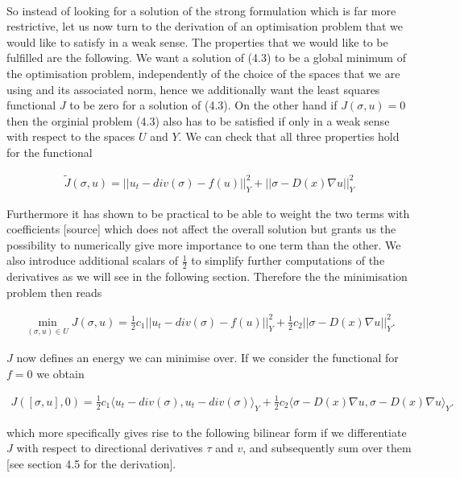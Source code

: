 \documentclass[../draft_1.tex]{subfiles}
\begin{document}
\smallskip
\\
So instead of looking for a solution of the strong formulation which is far more restrictive, let us now turn to the derivation of an optimisation problem that we would like to satisfy in a weak sense. The properties that we would like to be fulfilled are the following. We want a solution of (4.3) to be a global minimum of the optimisation problem, independently of the choice of the spaces that we are using and its associated norm, hence we additionally want the least squares functional $J$ to be zero for a solution of (4.3). On the other hand if $J(\sigma, u) = 0$ then the orginial problem (4.3) also has to be satisfied if only in a weak sense with respect to the spaces $U$ and $Y$. We can check that all three properties hold for the functional  
\begin{ceqn}
\begin{align}
\tilde{J}(\sigma, u) =|| u_t - div(\sigma) - f(u) ||_Y^2 + || \sigma - D(x) \nabla u || _Y^2
\end{align}
\end{ceqn}
Furthermore it has shown to be practical to be able to weight the two terms with coefficients [source] which does not affect the overall solution but grants us the possibility to numerically give more importance to one term than the other. We also introduce additional scalars of $\frac{1}{2}$ to simplify further computations of the derivatives as we will see in the following section. Therefore the the minimisation problem then reads
\begin{ceqn}
	\begin{align}
	\min_{(\sigma, u) \in U} J(\sigma, u) = \frac{1}{2} c_1 || u_t - div(\sigma) - f(u) ||_Y^2 + \frac{1}{2} c_2 || \sigma - D(x) \nabla u ||_Y^2.
	\end{align}
\end{ceqn}
$J$ now defines an energy we can minimise over. If we consider the functional for $ f = 0$ we obtain
\begin{ceqn}
	\begin{align}
J([\sigma, u], 0) = \frac{1}{2} c_1 \langle u_t - div(\sigma), u_t - div(\sigma)\rangle_Y + \frac{1}{2} c_2 \langle \sigma - D(x) \nabla u, \sigma - D(x) \nabla u \rangle_Y.
	\end{align}
\end{ceqn}
which more specifically gives rise to the following bilinear form if we differentiate $J$ with respect to directional derivatives $\tau$ and $v$, and subsequently sum over them [see section 4.5 for the derivation]. 
\end{document}
